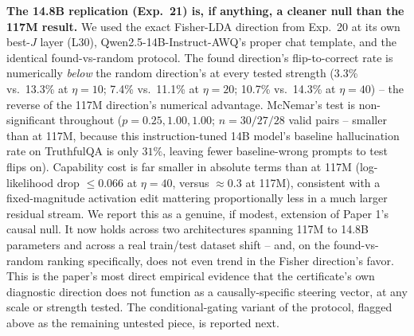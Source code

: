 \documentclass[10pt,twocolumn]{article}
\begin{document}
\textbf{The 14.8B replication (Exp.~21) is, if anything, a cleaner
null than the 117M result.} We used the exact Fisher-LDA direction
from Exp.~20 at its own best-$J$ layer (L30), Qwen2.5-14B-Instruct-AWQ's
proper chat template, and the identical found-vs-random protocol. The
found direction's flip-to-correct rate is numerically \emph{below} the
random direction's at every tested strength (3.3\% vs.\ 13.3\% at
$\eta=10$; 7.4\% vs.\ 11.1\% at $\eta=20$; 10.7\% vs.\ 14.3\% at
$\eta=40$) -- the reverse of the 117M direction's numerical advantage.
McNemar's test is non-significant throughout ($p=0.25,1.00,1.00$;
$n=30/27/28$ valid pairs -- smaller than at 117M, because this
instruction-tuned 14B model's baseline hallucination rate on
TruthfulQA is only $31\%$, leaving fewer baseline-wrong prompts to
test flips on). Capability cost is far smaller in absolute terms than
at 117M (log-likelihood drop $\leq 0.066$ at $\eta=40$, versus
$\approx 0.3$ at 117M), consistent with a fixed-magnitude activation
edit mattering proportionally less in a much larger residual stream.
We report this as a genuine, if modest, extension of Paper 1's causal
null. It now holds across two architectures spanning 117M to 14.8B
parameters and across a real train/test dataset shift -- and, on the
found-vs-random ranking specifically, does not even trend in the
Fisher direction's favor. This is the paper's most direct empirical
evidence that the certificate's own diagnostic direction does not
function as a causally-specific steering vector, at any scale or
strength tested. The conditional-gating variant of the protocol,
flagged above as the remaining untested piece, is reported next.
\end{document}
